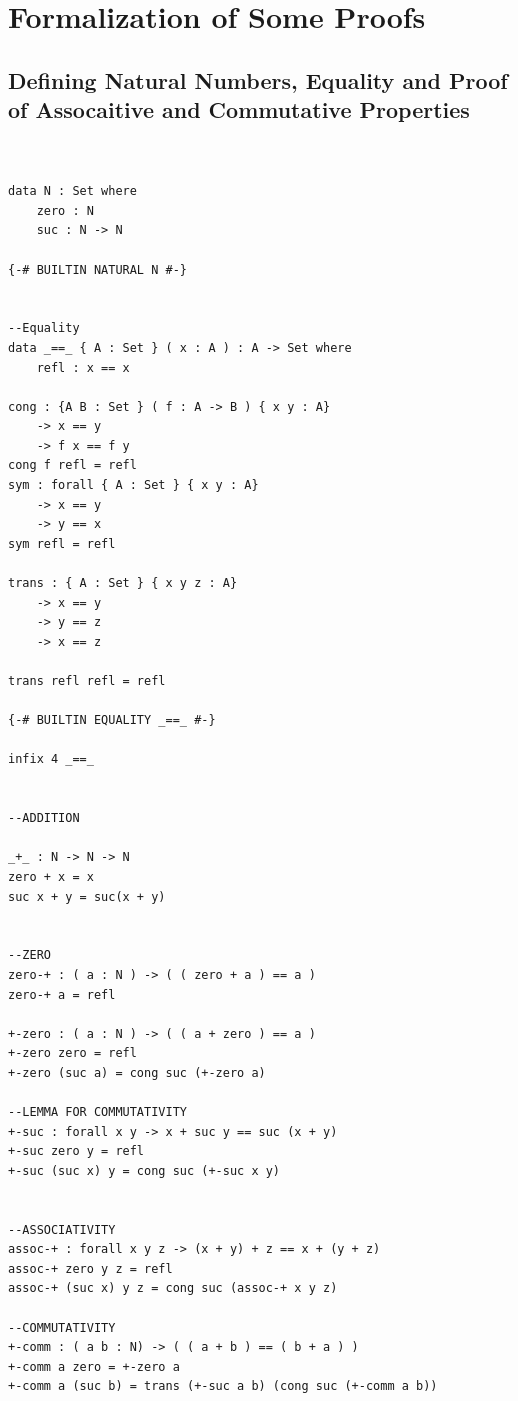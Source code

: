 \documentclass[12pt]{article}
\begin{document}
\clearpage

\section{Formalization of Some Proofs}


\subsection{Defining Natural Numbers, Equality and Proof of Assocaitive and Commutative Properties}
\begin{verbatim}


data N : Set where
    zero : N 
    suc : N -> N 

{-# BUILTIN NATURAL N #-}


--Equality
data _==_ { A : Set } ( x : A ) : A -> Set where 
    refl : x == x 

cong : {A B : Set } ( f : A -> B ) { x y : A}
    -> x == y
    -> f x == f y
cong f refl = refl 
sym : forall { A : Set } { x y : A}
    -> x == y
    -> y == x 
sym refl = refl

trans : { A : Set } { x y z : A}
    -> x == y
    -> y == z
    -> x == z

trans refl refl = refl 

{-# BUILTIN EQUALITY _==_ #-}

infix 4 _==_


--ADDITION

_+_ : N -> N -> N 
zero + x = x
suc x + y = suc(x + y)


--ZERO
zero-+ : ( a : N ) -> ( ( zero + a ) == a )
zero-+ a = refl

+-zero : ( a : N ) -> ( ( a + zero ) == a )
+-zero zero = refl
+-zero (suc a) = cong suc (+-zero a)

--LEMMA FOR COMMUTATIVITY
+-suc : forall x y -> x + suc y == suc (x + y)
+-suc zero y = refl
+-suc (suc x) y = cong suc (+-suc x y)


--ASSOCIATIVITY
assoc-+ : forall x y z -> (x + y) + z == x + (y + z)
assoc-+ zero y z = refl
assoc-+ (suc x) y z = cong suc (assoc-+ x y z)

--COMMUTATIVITY
+-comm : ( a b : N) -> ( ( a + b ) == ( b + a ) )
+-comm a zero = +-zero a 
+-comm a (suc b) = trans (+-suc a b) (cong suc (+-comm a b))


\end{verbatim}
\end{document}
